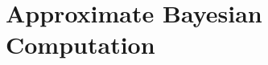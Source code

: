 


\pagebreak



\section{Approximate Bayesian Computation}
\label{ApproximateBayesianComputation}

